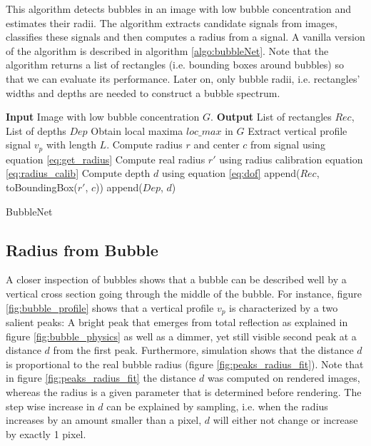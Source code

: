 	This algorithm detects bubbles in an image with low bubble concentration and estimates their radii. The algorithm extracts candidate signals from images, classifies these signals and then computes a radius from a signal. A vanilla version of the algorithm is described in algorithm \ref{algo:bubbleNet}. Note that the algorithm returns a list of rectangles (i.e. bounding boxes around bubbles) so that we can evaluate its performance. Later on, only bubble radii, i.e. rectangles' widths and depths are needed to construct a bubble spectrum. 
	
			\begin{algorithm}
			\begin{algorithmic}[1]
				\State \textbf{Input} Image with low bubble concentration $G$. 
				\State \textbf{Output} List of rectangles $Rec$, List of depths $Dep$
				\State Obtain local maxima $loc\_max$ in $G$
					\State Extract vertical profile signal $v_p$ with length $L$.
						\State Compute radius $r$ and center $c$ from signal using equation \ref{eq:get_radius}
						\State Compute real radius $r'$ using radius calibration equation \ref{eq:radius_calib}
						\State Compute depth $d$ using equation \ref{eq:dof}
						\State append($Rec$, toBoundingBox($r'$, $c$))
						\State append($Dep$, $d$)
					\EndIf
				\EndFor
			\end{algorithmic}
			
			\caption{BubbleNet}
			\label{algo:bubbleNet}
		\end{algorithm}
	
	\subsection{Radius from Bubble}
	
	A closer inspection of bubbles shows that a bubble can be described well by a vertical cross section going through the middle of the bubble. For instance, figure \ref{fig:bubble_profile} shows that a vertical profile $v_p$ is characterized by a two salient peaks: A bright peak that emerges from total reflection as explained in figure \ref{fig:bubble_physics} as well as a dimmer, yet still visible second peak at a distance $d$ from the first peak. Furthermore, simulation shows that the distance $d$ is proportional to the real bubble radius (figure \ref{fig:peaks_radius_fit}). Note that in figure \ref{fig:peaks_radius_fit} the distance $d$ was computed on rendered images, whereas the radius is a given parameter that is determined before rendering. The step wise increase in $d$ can be explained by sampling, i.e. when the radius increases by an amount smaller than a pixel, $d$ will either not change or increase by exactly 1 pixel.
	
